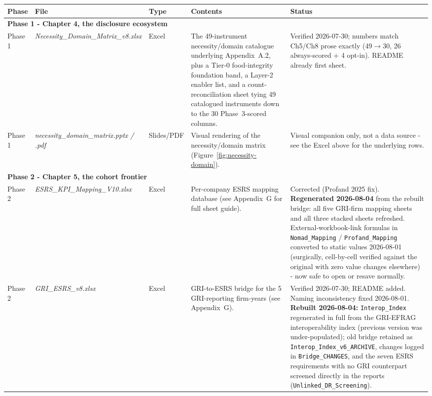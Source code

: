 \documentclass[
]{article}
\newcommand{\fb}{\discretionary{}{}{}} %
\begin{document}
\begin{landscape}\footnotesize\setlength{\tabcolsep}{4pt}\renewcommand{\arraystretch}{1.15}
\begin{longtable}{p{2.5cm}p{3.8cm}p{1.0cm}p{5.2cm}p{3.7cm}}
\toprule \textbf{Phase} & \textbf{File} & \textbf{Type} & \textbf{Contents} & \textbf{Status} \\ \midrule \endhead
\multicolumn{5}{l}{\rule{0pt}{1.1em}\textbf{Phase 1 - Chapter 4, the disclosure ecosystem}}\\[1pt]
Phase 1 & \emph{Necessity\_\fb Domain\_\fb Matrix\_\fb v8.xlsx} & Excel & The 49-instrument necessity/domain catalogue underlying Appendix~A.2, plus a Tier-0 food-integrity foundation band, a Layer-2 enabler list, and a count-reconciliation sheet tying 49 catalogued instruments down to the 30 Phase~3-scored columns. & Verified 2026-07-30; numbers match Ch5/Ch8 prose exactly (49$\to$30, 26 always-scored + 4 opt-in). README already first sheet. \\
Phase 1 & \emph{necessity\_\fb domain\_\fb matrix.pptx / .pdf} & Slides/PDF & Visual rendering of the necessity/domain matrix (Figure~\ref{fig:necessity-domain}). & Visual companion only, not a data source - see the Excel above for the underlying rows. \\
\multicolumn{5}{l}{\rule{0pt}{1.1em}\textbf{Phase 2 - Chapter 5, the cohort frontier}}\\[1pt]
Phase 2 & \emph{ESRS\_\fb KPI\_\fb Mapping\_\fb V10.xlsx} & Excel & Per-company ESRS mapping database (see Appendix~G for full sheet guide). & Corrected (Profand 2025 fix). \textbf{Regenerated 2026-08-04} from the rebuilt bridge: all five GRI-firm mapping sheets and all three stacked sheets refreshed. External-workbook-link formulas in \texttt{Nomad\_Mapping} / \texttt{Profand\_Mapping} converted to static values 2026-08-01 (surgically, cell-by-cell verified against the original with zero value changes elsewhere) - now safe to open or resave normally. \\
Phase 2 & \emph{GRI\_\fb ESRS\_\fb v8.xlsx} & Excel & GRI-to-ESRS bridge for the 5 GRI-reporting firm-years (see Appendix~G). & Verified 2026-07-30; README added. Naming inconsistency fixed 2026-08-01. \textbf{Rebuilt 2026-08-04:} \texttt{Interop\_Index} regenerated in full from the GRI-EFRAG interoperability index (previous version was under-populated); old bridge retained as \texttt{Interop\_Index\_v6\_ARCHIVE}, changes logged in \texttt{Bridge\_CHANGES}, and the seven ESRS requirements with no GRI counterpart screened directly in the reports (\texttt{Unlinked\_DR\_Screening}). \\

\end{longtable}
\end{landscape}
\end{document}

